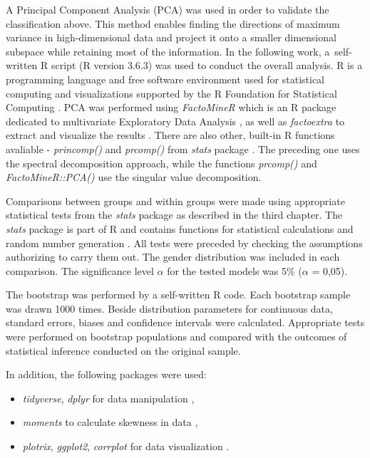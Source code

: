 \documentclass[12pt,a4paper,notitlepage]{report}
\begin{document}
A Principal Component Analysis (PCA) was used in order to validate the classification above. This method enables finding the directions of maximum variance in high-dimensional data and project it onto a smaller dimensional subspace while retaining most of the information. In the following work, \mbox{a self-written} R script (R version 3.6.3) was used to conduct the overall analysis. R is a programming language and free software environment used for statistical computing and visualizations supported by the R Foundation for Statistical Computing \cite{RCoreTeam13}. PCA was performed using \textit{FactoMineR} which is an R package dedicated to multivariate Exploratory Data Analysis \cite{factominer08}, as well as \textit{factoextra} to extract and visualize the results \cite{factoextra13}. There are also other, built-in R functions avaliable - \textit{princomp()} and \textit{prcomp()} from  \textit{stats} package \cite{RCoreTeam13}. The preceding one uses the spectral decomposition approach, while the functions \textit{prcomp()} and  \textit{FactoMineR::PCA()} use the singular value decomposition.

Comparisons between groups and within groups were made using appropriate statistical tests from the \textit{stats} package as described in the third chapter. The \textit{stats} package is part of R and contains functions for statistical calculations and random number generation \cite{RCoreTeam13}. All tests were preceded by checking the assumptions authorizing to carry them out. The gender distribution was included in each comparison. 
The significance level $\alpha$ for the tested models was 5\% ($\alpha$ = 0,05).

The bootstrap was performed by a self-written R code. Each bootstrap sample was drawn 1000 times. Beside distribution parameters for continuous data, standard errors, biases and confidence intervals were calculated. Appropriate tests were performed on bootstrap populations and compared with the outcomes of statistical inference conducted on the original sample.

In addition, the following packages were used:
\begin{itemize}
\item \textit{tidyverse}, \textit{dplyr} for data manipulation \cite{tidyverse19, dplyr18},
\item \textit{moments}  to calculate skewness in data \cite{moments15},
\item \textit{plotrix}, \textit{ggplot2}, \textit{corrplot} for data visualization \cite{plotrix06, ggplot216, corrplot17}.
\end{itemize}
\end{document}
